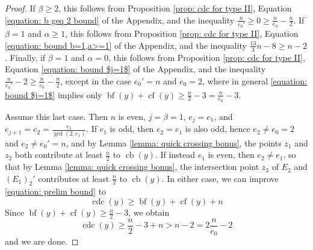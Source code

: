 \documentclass[12pt]{amsart}
\numberwithin{equation}{section}
\theoremstyle{definition}
\DeclareMathOperator{\blf}{bf}
\DeclareMathOperator{\cf}{cf}
\DeclareMathOperator{\cb}{cb}
\DeclareMathOperator{\cdc}{cdc}
\begin{document}
\begin{proof}
    If $\beta\geq 2$, this follows from Proposition \ref{prop: cdc for type II}, Equation \eqref{equation: b geq 2 bound} of the Appendix, and the inequality $\frac{n}{e_0'}\geq0\geq \frac{n}{e_0}-\frac{n}{2}$. If $\beta=1$ and $\alpha\geq1$, this follows from Proposition \ref{prop: cdc for type II}, Equation \eqref{equation: bound b=1,a>=1} of the Appendix, and the inequality $\frac{13}{3}n-8\geq n-2$. Finally, if $\beta=1$ and $\alpha=0$, this follows from Proposition \ref{prop: cdc for type II}, Equation \eqref{equation: bound $j=1$} of the Appendix, and the inequality $\frac{n}{e_0'}-2\geq\frac{n}{e_0}-\frac{n}{2}$, except in the case $e_0'=n$ and $e_0=2$, where in general \eqref{equation: bound $j=1$} implies only $\blf(y)+\cf(y)\geq\frac{n}{2}-3=\frac{n}{e_0}-3$.
    
    Assume this last case. Then $n$ is even, $j=\beta=1$, $e_j=e_1$, and $e_{j+1}=e_2=\frac{e_1}{\gcd(2,e_1)}$. If $e_1$ is odd, then $e_2=e_1$ is also odd, hence $e_2\neq e_0=2$ and $e_2\neq e_0'=n$, and by Lemma \ref{lemma: quick crossing bonus}, the points $z_1$ and $z_2$ both contribute at least $\frac{n}{2}$ to $\cb(y)$. If instead $e_1$ is even, then $e_2\neq e_1$, so that by Lemma \ref{lemma: quick crossing bonus}, the intersection point $z_3$ of $E_2$ and $(E_1)_2'$ contributes at least $\frac{n}{2}$ to $\cb(y)$. In either case, we can improve \eqref{equation: prelim bound} to 
    \[\cdc(y)\geq \blf(y)+\cf(y)+n\]
    Since $\blf(y)+\cf(y)\geq \frac{n}{2}-3$, we obtain \[\cdc(y)\geq \frac{n}{2}-3+n>n-2=2\frac{n}{e_0}-2\]
    and we are done.
\end{proof}
\end{document}
